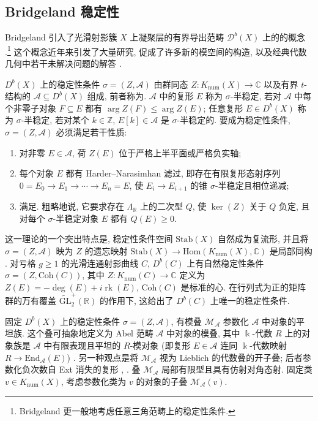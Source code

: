 \subsection{Bridgeland 稳定性}\label{src:10.2.4-subsection}
Bridgeland 引入了光滑射影簇 $X$ 上凝聚层的有界导出范畴 $\mathcal D^b(X)$ 上的的概念 \cite{Bri07}.\footnote{Bridgeland 更一般地考虑任意三角范畴上的稳定性条件.} 这个概念近年来引发了大量研究, 促成了许多新的模空间的构造, 以及经典代数几何中若干未解决问题的解答 \cite{BM23}.

$D^b(X)$ 上的稳定性条件 $\sigma=(Z,\mathcal A)$ 由群同态 $Z:K_{\mathrm{num}}(X)\to\mathbb C$ 以及有界 $t$-结构的 $\mathcal A\subseteq D^b(X)$ 组成, 前者称为. $\mathcal A$ 中的复形 $E$ 称为 $\sigma$-半稳定, 若对 $\mathcal A$ 中每个非零子对象 $F\subseteq E$ 都有 $\arg Z(F)\leq\arg Z(E)$; 任意复形 $E\in D^b(X)$ 称为 $\sigma$-半稳定, 若对某个 $k\in\mathbb Z$, $E[k]\in\mathcal A$ 是 $\sigma$-半稳定的. 要成为稳定性条件, $\sigma=(Z,\mathcal A)$ 必须满足若干性质:
\begin{enumerate}[(1)]
\item 对非零 $E\in\mathcal A$, 荷 $Z(E)$ 位于严格上半平面或严格负实轴;
\item 每个对象 $E$ 都有 Harder--Narasimhan 滤过, 即存在有限复形态射序列 $0=E_0\to E_1\to\cdots\to E_n=E$, 使 $E_i\to E_{i+1}$ 的锥 $\sigma$-半稳定且相位递减;
\item 满足. 粗略地说, 它要求存在 $\Lambda_{\mathbb R}$ 上的二次型 $Q$, 使 $\ker(Z)$ 关于 $Q$ 负定, 且对每个 $\sigma$-半稳定对象 $E$ 都有 $Q(E)\geq0$.
\end{enumerate}

这一理论的一个突出特点是, 稳定性条件空间 $\mathrm{Stab}(X)$ 自然成为复流形, 并且将 $\sigma=(Z,\mathcal A)$ 映为 $Z$ 的遗忘映射 $\mathrm{Stab}(X)\to\mathrm{Hom}(K_{\mathrm{num}}(X),\mathbb C)$ 是局部同构 \cite{Bri07}. 对亏格 $g\geq1$ 的光滑连通射影曲线 $C$, $D^b(C)$ 上有自然稳定性条件 $\sigma=(Z,\mathrm{Coh}(C))$, 其中 $Z:K_{\mathrm{num}}(C)\to\mathbb C$ 定义为 $Z(E)=-\deg(E)+i\operatorname{rk}(E)$, $\mathrm{Coh}(C)$ 是标准的心. 在行列式为正的矩阵群的万有覆盖 $\widetilde{\mathrm{GL}}_2^+(\mathbb R)$ 的作用下, 这给出了 $D^b(C)$ 上唯一的稳定性条件.

固定 $D^b(X)$ 上的稳定性条件 $\sigma=(Z,\mathcal A)$, 有模叠 $\mathcal M_{\mathcal A}$ 参数化 $\mathcal A$ 中对象的平坦族. 这个叠可抽象地定义为 Abel 范畴 $\mathcal A$ 中对象的模叠, 其中 $\Bbbk$-代数 $R$ 上的对象族是 $\mathcal A$ 中有限表现且平坦的 $R$-模对象 (即复形 $E\in\mathcal A$ 连同 $\Bbbk$-代数映射 $R\to\mathrm{End}_{\mathcal A}(E)$) \cite{AZ01,AP06,Pol07}. 另一种观点是将 $\mathcal M_{\mathcal A}$ 视为 Lieblich 的代数叠的开子叠; 后者参数化负次数自 Ext 消失的复形 \cite{Lie06a}, \cite[Tag 0DLN]{SP}. 叠 $\mathcal M_{\mathcal A}$ 局部有限型且具有仿射对角态射. 固定类 $v\in K_{\mathrm{num}}(X)$, 考虑参数化类为 $v$ 的对象的子叠 $\mathcal M_{\mathcal A}(v)$.

